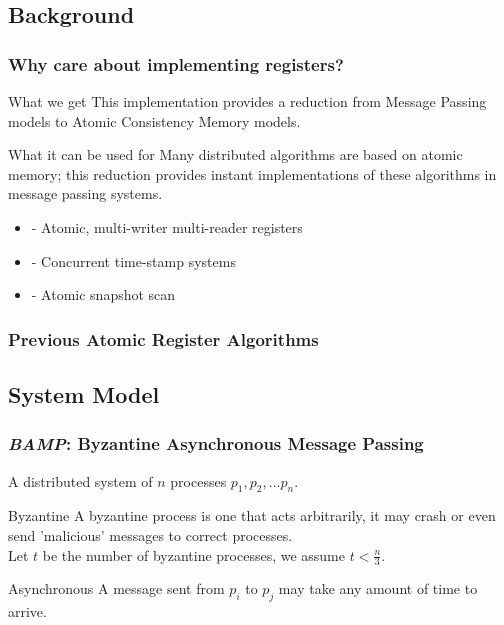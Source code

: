 \subsection{Background}
\begin{frame}
    \frametitle{Why care about implementing registers?}
    \begin{block}{What we get}
        This implementation provides a reduction from Message Passing models to Atomic Consistency Memory models.
    \end{block}
    \begin{block}{What it can be used for}
        Many distributed algorithms are based on atomic memory; this reduction provides instant implementations
        of these algorithms in message passing systems.
    \end{block}
    \begin{examples}
        \begin{itemize}
            \item - Atomic, multi-writer multi-reader registers 
            \item - Concurrent time-stamp systems
            \item - Atomic snapshot scan
        \end{itemize}
    \end{examples}
\end{frame}

\begin{frame}
    \frametitle{Previous Atomic Register Algorithms}
\end{frame}

\subsection{System Model}
\begin{frame}
    \frametitle{\emph{BAMP}: Byzantine Asynchronous Message Passing}
    A distributed system of $n$ processes $p_1, p_2, ... p_n$.
    \begin{block}{Byzantine}
        A byzantine process is one that acts arbitrarily, it may crash or even
        send 'malicious' messages to correct processes.\\
        Let $t$ be the number of byzantine processes, we assume $t<\frac{n}{3}$.
    \end{block}
    \begin{block}{Asynchronous}
        A message sent from $p_i$ to $p_j$ may take any amount of time to arrive.
    \end{block}
\end{frame}

